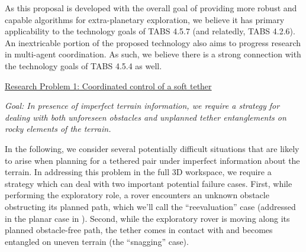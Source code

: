 \documentclass[12pt]{article}
\begin{document}
As this proposal is developed with the overall goal of providing more robust and capable algorithms for extra-planetary 
exploration, we believe it has primary applicability to the technology goals of TABS 4.5.7 (and relatedly, TABS 4.2.6). 
An inextricable portion of the proposed technology also aims to progress research in multi-agent coordination. As such, we 
believe there is a strong connection with the technology goals of TABS 4.5.4 as well.  


\noindent\underline{Research Problem 1: Coordinated control of a soft tether}

{\sl Goal: In presence of imperfect terrain information, we require a strategy for dealing with both 
unforeseen obstacles and unplanned tether entanglements on rocky elements of the terrain. }

In the following, we consider several potentially difficult situations that are likely 
to arise when planning for a tethered pair under imperfect information about the terrain. In 
addressing this problem in the full 3D workspace, we 
require a strategy which can deal with two important potential failure cases. First, while performing the exploratory role, a rover 
encounters an unknown obstacle obstructing its planned path, which we'll call the 
``reevaluation'' case (addressed in the planar case in \cite{axel_online}).
Second, while the exploratory rover is moving along its planned obstacle-free path, the tether comes in contact with and 
becomes entangled on uneven terrain (the ``snagging'' case).
\end{document}
